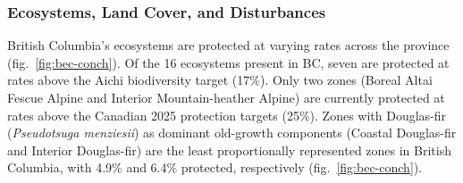 \documentclass[10pt,oneside]{article}
\begin{document}
\hypertarget{ecosystems-land-cover-and-disturbances-1}{%
\subsubsection{Ecosystems, Land Cover, and
Disturbances}\label{ecosystems-land-cover-and-disturbances-1}}

British Columbia's ecosystems are protected at varying rates across the
province (fig.~\ref{fig:bec-conch}). Of the 16 ecosystems present in BC,
seven are protected at rates above the Aichi biodiversity target (17\%).
Only two zones (Boreal Altai Fescue Alpine and Interior Mountain-heather
Alpine) are currently protected at rates above the Canadian 2025
protection targets (25\%). Zones with Douglas-fir (\emph{Pseudotsuga
menziesii}) as dominant old-growth components (Coastal Douglas-fir and
Interior Douglas-fir) are the least proportionally represented zones in
British Columbia, with 4.9\% and 6.4\% protected, respectively
(fig.~\ref{fig:bec-conch}).
\end{document}
